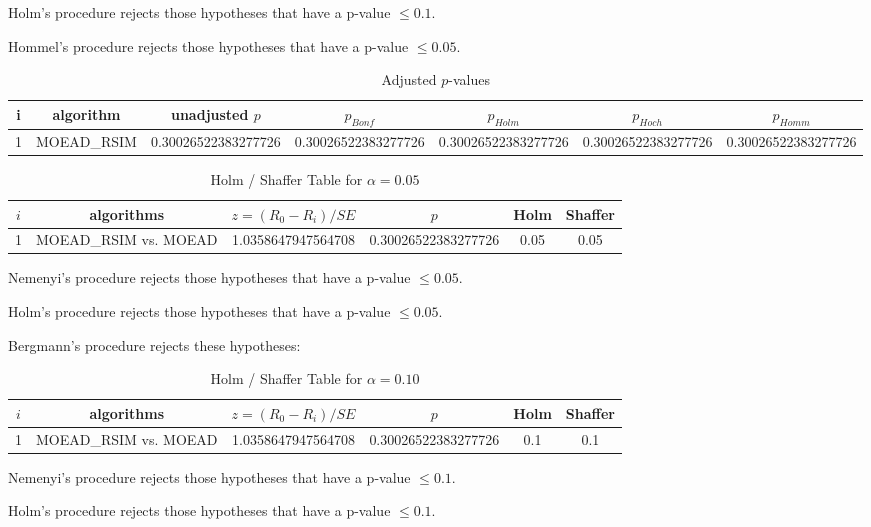 \documentclass[a4paper,10pt]{article}
\begin{document}
\begin{landscape}
Holm's procedure rejects those hypotheses that have a p-value $\le0.1$.


Hommel's procedure rejects those hypotheses that have a p-value $\le0.05$.


\begin{table}[!htp]
\centering\tiny
\caption{Adjusted $p$-values}
\begin{tabular}{ccccccc}
i&algorithm&unadjusted $p$&$p_{Bonf}$&$p_{Holm}$&$p_{Hoch}$&$p_{Homm}$\\
\hline
1&MOEAD_RSIM&0.30026522383277726&0.30026522383277726&0.30026522383277726&0.30026522383277726&0.30026522383277726\\
\hline
\end{tabular}
\end{table}

\begin{table}[!htp]
\centering\tiny
\caption{Holm / Shaffer Table for $\alpha=0.05$}
\begin{tabular}{cccccc}
$i$&algorithms&$z=(R_0 - R_i)/SE$&$p$&Holm&Shaffer\\
\hline
1&MOEAD_RSIM vs. MOEAD&1.0358647947564708&0.30026522383277726&0.05&0.05\\
\hline
\end{tabular}
\end{table}
Nemenyi's procedure rejects those hypotheses that have a p-value $\le0.05$.


Holm's procedure rejects those hypotheses that have a p-value $\le0.05$.


Bergmann's procedure rejects these hypotheses:


\begin{itemize}


\end{itemize}


\begin{table}[!htp]
\centering\tiny
\caption{Holm / Shaffer Table for $\alpha=0.10$}
\begin{tabular}{cccccc}
$i$&algorithms&$z=(R_0 - R_i)/SE$&$p$&Holm&Shaffer\\
\hline
1&MOEAD_RSIM vs. MOEAD&1.0358647947564708&0.30026522383277726&0.1&0.1\\
\hline
\end{tabular}
\end{table}
Nemenyi's procedure rejects those hypotheses that have a p-value $\le0.1$.


Holm's procedure rejects those hypotheses that have a p-value $\le0.1$.



\end{landscape}
\end{document}
